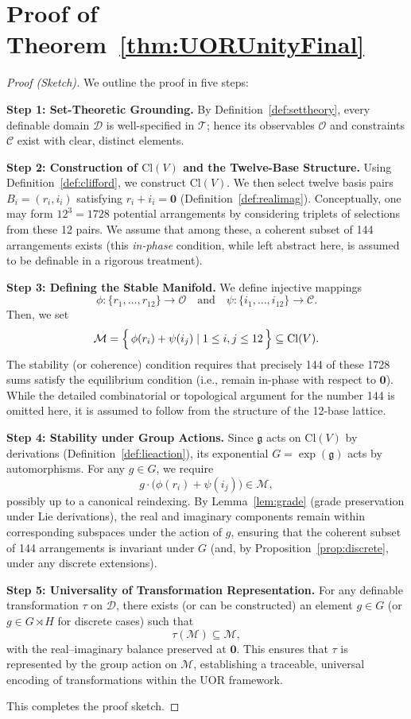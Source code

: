 \documentclass{article}
\begin{document}
\section{Proof of Theorem~\ref{thm:UORUnityFinal}}

\begin{proof}[Proof (Sketch)]
We outline the proof in five steps:

\textbf{Step 1: Set-Theoretic Grounding.}  
By Definition~\ref{def:settheory}, every definable domain $\mathcal{D}$ is well-specified in $\mathcal{T}$; hence its observables $\mathcal{O}$ and constraints $\mathcal{C}$ exist with clear, distinct elements. 

\textbf{Step 2: Construction of $\mathrm{Cl}(V)$ and the Twelve-Base Structure.}  
Using Definition~\ref{def:clifford}, we construct $\mathrm{Cl}(V)$. We then select twelve basis pairs $B_i=(r_i,i_i)$ satisfying $r_i + i_i = \mathbf{0}$ (Definition~\ref{def:realimag}). Conceptually, one may form $12^3 = 1728$ potential arrangements by considering triplets of selections from these 12 pairs. We assume that among these, a coherent subset of 144 arrangements exists (this \emph{in-phase} condition, while left abstract here, is assumed to be definable in a rigorous treatment).

\textbf{Step 3: Defining the Stable Manifold.}  
We define injective mappings
\[
\phi:\{r_1,\dots,r_{12}\}\to \mathcal{O} \quad \text{and} \quad \psi:\{i_1,\dots,i_{12}\}\to \mathcal{C}.
\]
Then, we set
\[
\mathcal{M} = \Bigl\{\,\phi(r_i)+\psi(i_j) \mid 1\le i,j\le 12\,\Bigr\} \subseteq \mathrm{Cl}(V).
\]
The stability (or coherence) condition requires that precisely 144 of these 1728 sums satisfy the equilibrium condition (i.e., remain in-phase with respect to $\mathbf{0}$). While the detailed combinatorial or topological argument for the number 144 is omitted here, it is assumed to follow from the structure of the 12-base lattice.

\textbf{Step 4: Stability under Group Actions.}  
Since $\mathfrak{g}$ acts on $\mathrm{Cl}(V)$ by derivations (Definition~\ref{def:lieaction}), its exponential $G=\exp(\mathfrak{g})$ acts by automorphisms. For any $g\in G$, we require
\[
g \cdot \bigl(\phi(r_i)+\psi(i_j)\bigr) \in \mathcal{M},
\]
possibly up to a canonical reindexing. By Lemma~\ref{lem:grade} (grade preservation under Lie derivations), the real and imaginary components remain within corresponding subspaces under the action of $g$, ensuring that the coherent subset of 144 arrangements is invariant under $G$ (and, by Proposition~\ref{prop:discrete}, under any discrete extensions).

\textbf{Step 5: Universality of Transformation Representation.}  
For any definable transformation $\tau$ on $\mathcal{D}$, there exists (or can be constructed) an element $g \in G$ (or $g \in G\rtimes H$ for discrete cases) such that
\[
\tau(\mathcal{M}) \subseteq \mathcal{M},
\]
with the real--imaginary balance preserved at $\mathbf{0}$. This ensures that $\tau$ is represented by the group action on $\mathcal{M}$, establishing a traceable, universal encoding of transformations within the UOR framework.

This completes the proof sketch.
\end{proof}
\end{document}
